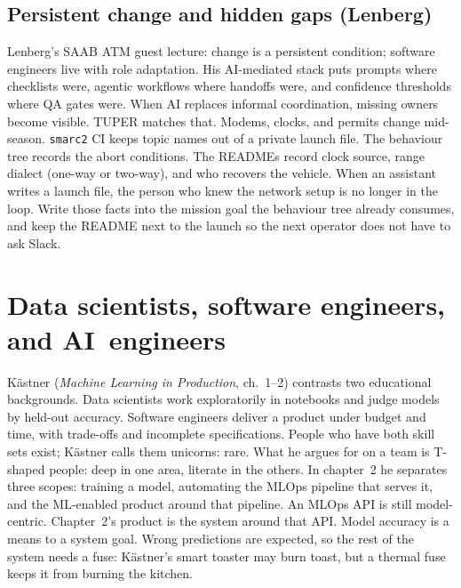 \documentclass[11pt,a4paper,twocolumn]{amsart}
\begin{document}
\subsection{Persistent change and hidden gaps (Lenberg)}
\label{sec:lenberg}

Lenberg's SAAB ATM guest lecture: change is a persistent condition; software engineers live with role adaptation. His AI-mediated stack puts prompts where checklists were, agentic workflows where handoffs were, and confidence thresholds where QA gates were. When AI replaces informal coordination, missing owners become visible. TUPER matches that. Modems, clocks, and permits change mid-season. \texttt{smarc2} CI keeps topic names out of a private launch file. The behaviour tree records the abort conditions. The READMEs record clock source, range dialect (one-way or two-way), and who recovers the vehicle. When an assistant writes a launch file, the person who knew the network setup is no longer in the loop. Write those facts into the mission goal the behaviour tree already consumes, and keep the README next to the launch so the next operator does not have to ask Slack.

\section{Data scientists, software engineers, and \mbox{AI engineers}}
\label{sec:roles}

K\"{a}stner (\emph{Machine Learning in Production}, ch.~1--2) contrasts two educational backgrounds. Data scientists work exploratorily in notebooks and judge models by held-out accuracy. Software engineers deliver a product under budget and time, with trade-offs and incomplete specifications. People who have both skill sets exist; K\"{a}stner calls them unicorns: rare. What he argues for on a team is T-shaped people: deep in one area, literate in the others. In chapter~2 he separates three scopes: training a model, automating the MLOps pipeline that serves it, and the ML-enabled product around that pipeline. An MLOps API is still model-centric. Chapter~2's product is the system around that API. Model accuracy is a means to a system goal. Wrong predictions are expected, so the rest of the system needs a fuse: K\"{a}stner's smart toaster may burn toast, but a thermal fuse keeps it from burning the kitchen.
\end{document}
